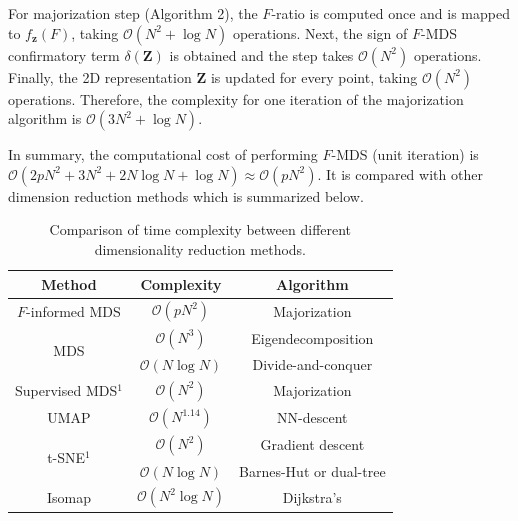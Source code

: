 \documentclass[11pt]{article}
\newcommand{\1}{{\rm 1}\kern-0.24em{\rm I}}
\newcommand{\cO}{\mathcal{O}}
\begin{document}
For majorization step (Algorithm 2), the $F$-ratio is computed once and is mapped to $f_\mathbf{z}(F)$, taking $\cO(N^2 + \log N)$ operations.
Next, the sign of $F$-MDS confirmatory term $\delta(\mathbf{Z})$ is obtained and the step takes $\cO(N^2)$ operations.
Finally, the 2D representation $\mathbf{Z}$ is updated for every point, taking $\cO(N^2)$ operations.
Therefore, the complexity for one iteration of the majorization algorithm is $\cO(3N^2 + \log N)$.

In summary, the computational cost of performing $F$-MDS (unit iteration) is $\cO(2pN^2 + 3N^2 + 2N\log N + \log N) \approx \cO(pN^2)$. 
It is compared with other dimension reduction methods which is summarized below.

\begin{table}[h]
    \caption*{Comparison of time complexity between different dimensionality reduction methods.}
    \centering
    \begin{tabular}{c c c}
    \hline
       Method & Complexity & Algorithm \\
    \hline
        $F$-informed MDS\footnotemark & $\cO(pN^2)$ & Majorization \cite{borg97a} \\
        \multirow[c]{2}{*}{MDS} & $\cO(N^3)$ & Eigendecomposition \cite{Torgerson52} \\
         & $\cO(N\log N)$ & Divide-and-conquer \cite{Yang06} \\
        Supervised MDS$^1$ & $\cO(N^2)$ & Majorization \cite{witten11} \\
        UMAP & $\cO(N^{1.14})$ & NN-descent \cite{mcInnes18, Dong11} \\
        \multirow{2}{*}{t-SNE$^1$} & $\cO(N^2)$ & Gradient descent \cite{maaten08} \\
         & $\cO(N\log N)$ & Barnes-Hut or dual-tree \cite{Maaten14} \\
        Isomap & $\cO(N^2\log N)$ & Dijkstra’s \cite{tenenbaum00, Pedregosa11} \\
    \hline
    \end{tabular}
    \label{tab:complexity}
\end{table}


\clearpage
\end{document}
